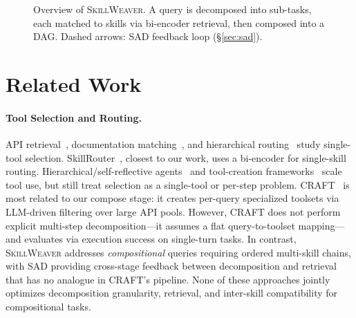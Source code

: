 \documentclass[11pt]{article}
\newcommand{\system}{\textsc{SkillWeaver}}
\begin{document}
\begin{figure}[t]
\caption{Overview of \system{}. A query is decomposed into sub-tasks, each matched to skills via bi-encoder retrieval, then composed into a DAG. Dashed arrows: SAD feedback loop (\S\ref{sec:sad}).}
\label{fig:overview}
\end{figure}

\section{Related Work}
\label{sec:related}

\paragraph{Tool Selection and Routing.}
API retrieval~\cite{patil2023gorilla,qin2023toolllm}, documentation matching~\cite{hao2024toolkengpt}, and hierarchical routing~\cite{xu2025skillrouter} study single-tool selection.
SkillRouter~\cite{xu2025skillrouter}, closest to our work, uses a bi-encoder for single-skill routing.
Hierarchical/self-reflective agents~\cite{du2024anytool} and tool-creation frameworks~\cite{yuan2024craft} scale tool use, but still treat selection as a single-tool or per-step problem.
CRAFT~\cite{yuan2024craft} is most related to our compose stage: it creates per-query specialized toolsets via LLM-driven filtering over large API pools.
However, CRAFT does not perform explicit multi-step decomposition---it assumes a flat query-to-toolset mapping---and evaluates via execution success on single-turn tasks.
In contrast, \system{} addresses \emph{compositional} queries requiring ordered multi-skill chains, with SAD providing cross-stage feedback between decomposition and retrieval that has no analogue in CRAFT's pipeline.
None of these approaches jointly optimizes decomposition granularity, retrieval, and inter-skill compatibility for compositional tasks.
\end{document}
